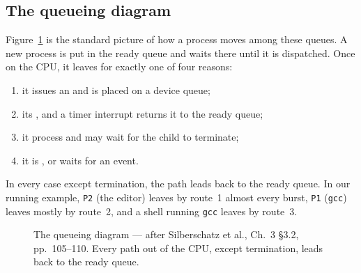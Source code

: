 \documentclass[11pt]{article}
\begin{document}
\subsection{The queueing diagram}

Figure~\ref{fig:queueing} is the standard picture of how a process moves among
these queues. A new process is put in the ready queue and waits there until it
is dispatched. Once on the CPU, it leaves for exactly one of four reasons:
\begin{enumerate}
  \item it issues an  and is placed on a device queue;
  \item its , and a timer interrupt returns it to the
        ready queue;
  \item it  process and may wait for the child to
        terminate;
  \item it is , or waits for an event.
\end{enumerate}
In every case except termination, the path leads back to the ready queue. In
our running example, \texttt{P2} (the editor) leaves by route~1 almost every
burst, \texttt{P1} (\texttt{gcc}) leaves mostly by route~2, and a shell running
\texttt{gcc} leaves by route~3.

\begin{figure}[h]
\centering
{}
\caption{The queueing diagram --- after Silberschatz et al., Ch.~3 \S3.2,
pp.~105--110. Every path out of the CPU, except termination, leads back to the
ready queue.}
\label{fig:queueing}
\end{figure}
\end{document}
